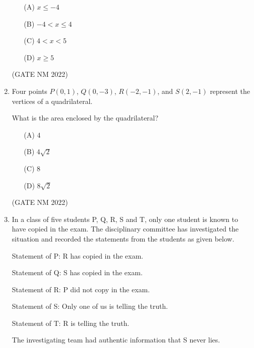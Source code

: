 \documentclass[journal,12pt,onecolumn]{IEEEtran}
\theoremstyle{remark}
\begin{document}
\begin{enumerate}
\begin{multicols}{2}

\begin{enumerate}
    \item[(A)] $x \leq -4$
    \item[(B)] $-4 < x \leq 4$
    \item[(C)] $4 < x < 5$
    \item[(D)] $x \geq 5$
\end{enumerate}

\end{multicols}

\hfill(GATE NM 2022)



\item  Four points $P(0, 1)$, $Q(0, -3)$, $R(-2, -1)$, and $S(2, -1)$ represent the vertices of a quadrilateral.  

What is the area enclosed by the quadrilateral? 

\begin{multicols}{4}

\begin{enumerate}
    \item[(A)] $4$
    \item[(B)] $4\sqrt{2}$
    \item[(C)] $8$
    \item[(D)] $8\sqrt{2}$
\end{enumerate}

\end{multicols}

\hfill(GATE NM 2022)






\item  In a class of five students P, Q, R, S and T, only one student is known to have copied in the exam. The disciplinary committee has investigated the situation and recorded the statements from the students as given below.  

{Statement of P:} R has copied in the exam.  

{Statement of Q:} S has copied in the exam.  

{Statement of R:} P did not copy in the exam.  

{Statement of S:} Only one of us is telling the truth.  

{Statement of T:} R is telling the truth.  

The investigating team had authentic information that S never lies.  


\end{enumerate}
\end{document}
